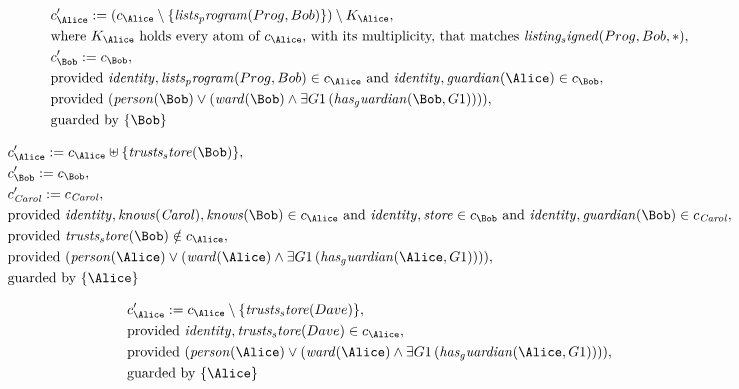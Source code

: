 \begin{align*}
&
c'_
{
\Alice
}
 := 
(c_
{
\Alice
}
 \setminus 
\{
\mathit{
lists_program
}
(
Prog
,
Bob
)
\}
) \setminus K_
{
\Alice
}
,\\
&
\text{where } K_
{
\Alice
}
 \text{ holds every atom of } c_
{
\Alice
}
 \text{, with its multiplicity, that matches } 
\mathit{
listing_signed
}
(
Prog
,
Bob
,
\ast
)
,\\
&
c'_
{
\Bob
}
 := 
c_
{
\Bob
}
,\\
&
\text{provided } 
\mathit{
identity
}
,
\mathit{
lists_program
}
(
Prog
,
Bob
)
 \in c_
{
\Alice
}
 \text{ and } 
\mathit{
identity
}
,
\mathit{
guardian
}
(
\Alice
)
 \in c_
{
\Bob
}
,\\
&
\text{provided } 
(
\mathit{
person
}
(
\Bob
)
\lor
(
\mathit{
ward
}
(
\Bob
)
\land
\exists 
G1
\,(
\mathit{
has_guardian
}
(
\Bob
,
G1
)
)
)
)
,\\
&
\text{guarded by } \{
\Bob
\}
\end{align*}

\begin{align*}
&
c'_
{
\Alice
}
 := 
c_
{
\Alice
}
 \uplus 
\{
\mathit{
trusts_store
}
(
\Bob
)
\}
,\\
&
c'_
{
\Bob
}
 := 
c_
{
\Bob
}
,\\
&
c'_
{
\mathit{Carol}
}
 := 
c_
{
\mathit{Carol}
}
,\\
&
\text{provided } 
\mathit{
identity
}
,
\mathit{
knows
}
(
\mathit{Carol}
)
,
\mathit{
knows
}
(
\Bob
)
 \in c_
{
\Alice
}
 \text{ and } 
\mathit{
identity
}
,
\mathit{
store
}
 \in c_
{
\Bob
}
 \text{ and } 
\mathit{
identity
}
,
\mathit{
guardian
}
(
\Bob
)
 \in c_
{
\mathit{Carol}
}
,\\
&
\text{provided } 
\mathit{
trusts_store
}
(
\Bob
)
 \notin c_
{
\Alice
}
,\\
&
\text{provided } 
(
\mathit{
person
}
(
\Alice
)
\lor
(
\mathit{
ward
}
(
\Alice
)
\land
\exists 
G1
\,(
\mathit{
has_guardian
}
(
\Alice
,
G1
)
)
)
)
,\\
&
\text{guarded by } \{
\Alice
\}
\end{align*}

\begin{align*}
&
c'_
{
\Alice
}
 := 
c_
{
\Alice
}
 \setminus 
\{
\mathit{
trusts_store
}
(
Dave
)
\}
,\\
&
\text{provided } 
\mathit{
identity
}
,
\mathit{
trusts_store
}
(
Dave
)
 \in c_
{
\Alice
}
,\\
&
\text{provided } 
(
\mathit{
person
}
(
\Alice
)
\lor
(
\mathit{
ward
}
(
\Alice
)
\land
\exists 
G1
\,(
\mathit{
has_guardian
}
(
\Alice
,
G1
)
)
)
)
,\\
&
\text{guarded by } \{
\Alice
\}
\end{align*}
